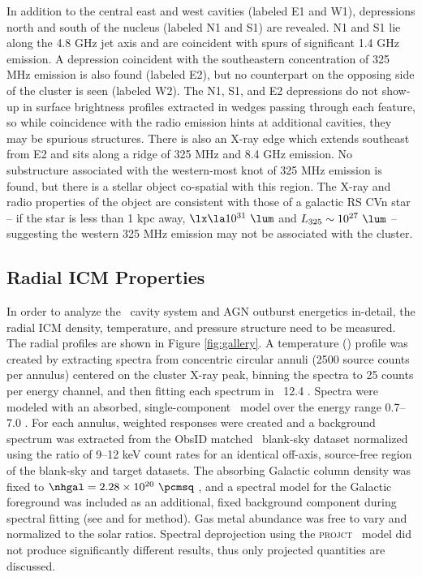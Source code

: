 \documentclass[11pt, preprint]{aastex}
\begin{document}
In addition to the central east and west cavities (labeled E1 and W1),
depressions north and south of the nucleus (labeled N1 and S1) are
revealed. N1 and S1 lie along the 4.8 GHz jet axis and are coincident
with spurs of significant 1.4 GHz emission. A depression coincident
with the southeastern concentration of 325 MHz emission is also found
(labeled E2), but no counterpart on the opposing side of the cluster
is seen (labeled W2). The N1, S1, and E2 depressions do not show-up in
surface brightness profiles extracted in wedges passing through each
feature, so while coincidence with the radio emission hints at
additional cavities, they may be spurious structures. There is also an
X-ray edge which extends southeast from E2 and sits along a ridge of
325 MHz and 8.4 GHz emission. No substructure associated with the
western-most knot of 325 MHz emission is found, but there is a stellar
object co-spatial with this region.  The X-ray and radio properties of
the object are consistent with those of a galactic RS CVn star
\citep{1993RPPh...56.1145S} -- if the star is less than 1 kpc away,
$\lx \la 10^{31} ~\lum$ and $L_{325} \sim 10^{27} ~\lum$ -- suggesting
the western 325 MHz emission may not be associated with the cluster.

\subsection{Radial ICM Properties}
\label{sec:icm}

In order to analyze the \rbs\ cavity system and AGN outburst
energetics in-detail, the radial ICM density, temperature, and
pressure structure need to be measured. The radial profiles are shown
in Figure \ref{fig:gallery}. A temperature (\tx) profile was created
by extracting spectra from concentric circular annuli (2500 source
counts per annulus) centered on the cluster X-ray peak, binning the
spectra to 25 counts per energy channel, and then fitting each
spectrum in \xspec\ 12.4 \citep{xspec}. Spectra were modeled with an
absorbed, single-component \mekal\ model \citep{mekal1} over the
energy range 0.7--7.0 \keV. For each annulus, weighted responses were
created and a background spectrum was extracted from the ObsID matched
\caldb\ blank-sky dataset normalized using the ratio of 9--12 keV
count rates for an identical off-axis, source-free region of the
blank-sky and target datasets. The absorbing Galactic column density
was fixed to $\nhgal = 2.28 \times 10^{20} ~\pcmsq$ \citep{lab}, and a
spectral model for the Galactic foreground was included as an
additional, fixed background component during spectral fitting (see
\citealt{2005ApJ...628..655V} and \citealt{xrayband} for method). Gas
metal abundance was free to vary and normalized to the \citet{ag89}
solar ratios. Spectral deprojection using the {\textsc{projct}}
\xspec\ model did not produce significantly different results, thus
only projected quantities are discussed.
\end{document}
